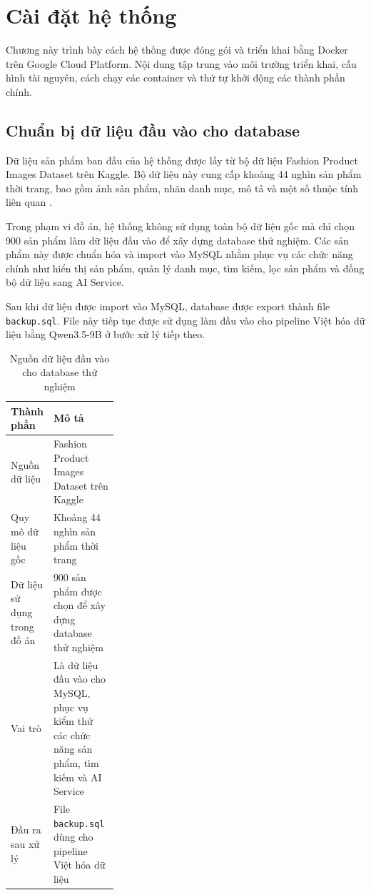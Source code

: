 
\section{Cài đặt hệ thống}

Chương này trình bày cách hệ thống được đóng gói và triển khai bằng Docker trên Google Cloud Platform. Nội dung tập trung vào môi trường triển khai, cấu hình tài nguyên, cách chạy các container và thứ tự khởi động các thành phần chính.
\subsection{Chuẩn bị dữ liệu đầu vào cho database}

Dữ liệu sản phẩm ban đầu của hệ thống được lấy từ bộ dữ liệu Fashion Product Images Dataset trên Kaggle. Bộ dữ liệu này cung cấp khoảng 44 nghìn sản phẩm thời trang, bao gồm ảnh sản phẩm, nhãn danh mục, mô tả và một số thuộc tính liên quan \parencite{paramaggarwalFashionProductImages}.

Trong phạm vi đồ án, hệ thống không sử dụng toàn bộ dữ liệu gốc mà chỉ chọn 900 sản phẩm làm dữ liệu đầu vào để xây dựng database thử nghiệm. Các sản phẩm này được chuẩn hóa và import vào MySQL nhằm phục vụ các chức năng chính như hiển thị sản phẩm, quản lý danh mục, tìm kiếm, lọc sản phẩm và đồng bộ dữ liệu sang AI Service.

Sau khi dữ liệu được import vào MySQL, database được export thành file \texttt{backup.sql}. File này tiếp tục được sử dụng làm đầu vào cho pipeline Việt hóa dữ liệu bằng Qwen3.5-9B ở bước xử lý tiếp theo.

\begin{table}[H]
\centering
\caption{Nguồn dữ liệu đầu vào cho database thử nghiệm}
\label{tab:database-input-dataset}
\begin{tabularx}{\linewidth}{@{}p{0.30\linewidth}X@{}}
\toprule
\textbf{Thành phần} & \textbf{Mô tả} \\
\midrule
Nguồn dữ liệu & Fashion Product Images Dataset trên Kaggle \\
Quy mô dữ liệu gốc & Khoảng 44 nghìn sản phẩm thời trang \\
Dữ liệu sử dụng trong đồ án & 900 sản phẩm được chọn để xây dựng database thử nghiệm \\
Vai trò & Là dữ liệu đầu vào cho MySQL, phục vụ kiểm thử các chức năng sản phẩm, tìm kiếm và AI Service \\
Đầu ra sau xử lý & File \texttt{backup.sql} dùng cho pipeline Việt hóa dữ liệu \\
\bottomrule
\end{tabularx}
\end{table}
